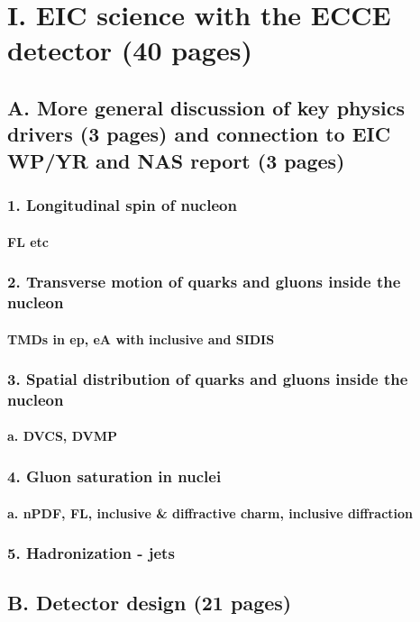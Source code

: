 \documentclass{report}
\begin{document}
\chapter{I. EIC science with the ECCE detector (40 pages)}
%
\section{A. More general discussion of key physics drivers (3 pages) and connection to EIC WP/YR and NAS report (3 pages)}
\subsection{1. Longitudinal spin of nucleon}
\subsubsection{FL etc}
\subsection{2. Transverse motion of quarks and gluons inside the nucleon}
\subsubsection{TMDs in ep, eA with inclusive and SIDIS}

\subsection{3. Spatial distribution of quarks and gluons inside the nucleon}
\subsubsection{a. DVCS, DVMP}
\subsection{4. Gluon saturation in nuclei}
\subsubsection{a. nPDF, FL, inclusive & diffractive charm, inclusive diffraction}
\subsection{5. Hadronization - jets}
%
\section{B. Detector design (21 pages)}
\end{document}

